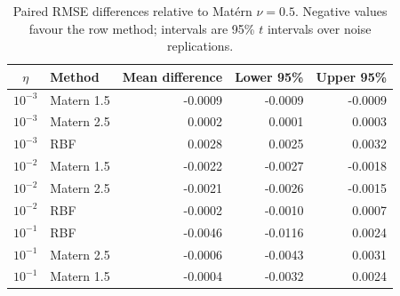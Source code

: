 \begin{table}[H]
\centering
\caption{Paired RMSE differences relative to Mat\'ern $\nu=0.5$. Negative values favour the row method; intervals are 95\% $t$ intervals over noise replications.}
\label{tab:paired-rmse}
\small
\begin{tabular}{clrrr}
\toprule
$\eta$ & Method & Mean difference & Lower 95\% & Upper 95\%\\
\midrule
$10^{-3}$ & Matern 1.5 & -0.0009 & -0.0009 & -0.0009\\
$10^{-3}$ & Matern 2.5 & 0.0002 & 0.0001 & 0.0003\\
$10^{-3}$ & RBF & 0.0028 & 0.0025 & 0.0032\\
$10^{-2}$ & Matern 1.5 & -0.0022 & -0.0027 & -0.0018\\
$10^{-2}$ & Matern 2.5 & -0.0021 & -0.0026 & -0.0015\\
$10^{-2}$ & RBF & -0.0002 & -0.0010 & 0.0007\\
$10^{-1}$ & RBF & -0.0046 & -0.0116 & 0.0024\\
$10^{-1}$ & Matern 2.5 & -0.0006 & -0.0043 & 0.0031\\
$10^{-1}$ & Matern 1.5 & -0.0004 & -0.0032 & 0.0024\\
\bottomrule
\end{tabular}
\end{table}
